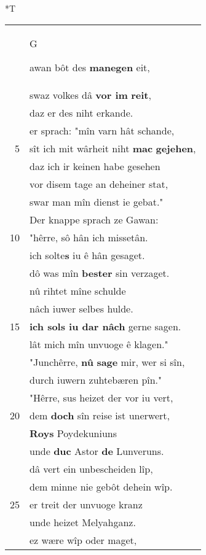 \documentclass[8pt,a4paper,notitlepage]{article}
\begin{document}
\begin{table}[ht]
\begin{minipage}[t]{0.5\linewidth}
\end{minipage}
\hspace{0.5cm}
\begin{minipage}[t]{0.5\linewidth}
\small
\begin{center}*T
\end{center}
\begin{tabular}{rl}
 & \begin{large}G\end{large}awan bôt des \textbf{manegen} eit,\\ 
 & swaz volkes dâ \textbf{vor im} \textbf{reit},\\ 
 & daz er des niht erkande.\\ 
 & er sprach: "mîn varn hât schande,\\ 
5 & sît ich mit wârheit niht \textbf{mac} \textbf{gejehen},\\ 
 & daz ich ir keinen habe gesehen\\ 
 & vor disem tage an deheiner stat,\\ 
 & swar man mîn dienst ie gebat."\\ 
 & Der knappe sprach ze Gawan:\\ 
10 & "hêrre, sô hân ich missetân.\\ 
 & ich solte\textbf{s} iu ê hân gesaget.\\ 
 & dô was mîn \textbf{bester} sin verzaget.\\ 
 & nû rihtet mîne schulde\\ 
 & nâch iuwer selbes hulde.\\ 
15 & \textbf{ich sols iu dar nâch} gerne sagen.\\ 
 & lât mich mîn unvuoge ê klagen."\\ 
 & "Junchêrre, \textbf{nû} \textbf{sage} mir, wer si sîn,\\ 
 & durch iuwern zuhtebæren pîn."\\ 
 & "Hêrre, sus heizet der vor iu vert,\\ 
20 & dem \textbf{doch} sîn reise ist unerwert,\\ 
 & \textbf{Roys} Poydekuniuns\\ 
 & unde \textbf{duc} Astor \textbf{de} Lunveruns.\\ 
 & dâ vert ein unbescheiden lîp,\\ 
 & dem minne nie gebôt dehein wîp.\\ 
25 & er treit der unvuoge kranz\\ 
 & unde heizet Melyahganz.\\ 
 & ez wære wîp oder maget,\\ 

\end{tabular}
\end{minipage}
\end{table}
\end{document}
